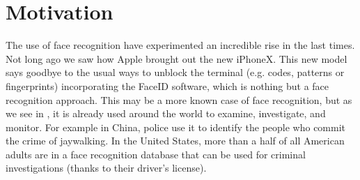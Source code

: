 \section{Motivation}
The use of face recognition have experimented an incredible rise in the last times. Not long ago we saw how Apple brought out the new iPhoneX. This new model says goodbye to the usual ways to unblock the terminal (e.g. codes, patterns or fingerprints) incorporating the FaceID software, which is nothing but a face recognition approach. This may be a more known case of face recognition, but as we see in \cite{iphonex_and_other_uses}, it is already used around the world to examine, investigate, and monitor. For example in China, police use it to identify the people who commit the crime of jaywalking. In the United States, more than a half of all American adults are in a face recognition database that can be used for criminal investigations (thanks to their driver’s license).





